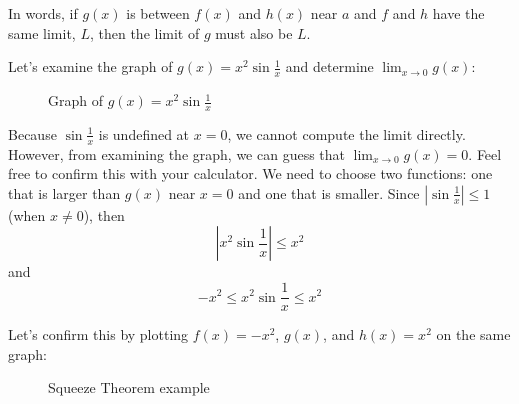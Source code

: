 In words, if $g(x)$ is between $f(x)$ and $h(x)$ near $a$ and $f$ and $h$ have the 
same limit, $L$, then the limit of $g$ must also be $L$. 

Let's examine the graph of $g(x) = x^2\sin{\frac{1}{x}}$ and determine $\lim_{x \to 
0}g(x)$:

\begin{figure}[htbp]
\centering
{}
\caption{Graph of $g(x) = x^2\sin{\frac{1}{x}}$}
\end{figure}

Because $\sin{\frac{1}{x}}$ is undefined at $x=0$, we cannot compute the limit 
directly. However, from examining the graph, we can guess that $\lim_{x \to 0}
g(x)=0$. Feel free to confirm this with your calculator. We need to choose two 
functions: one that is larger than $g(x)$ near $x=0$ and one that is smaller. Since 
$|\sin{\frac{1}{x}}|\leq 1$ (when $x \neq 0$), then $$|x^2\sin{\frac{1}{x}}|\leq 
x^2$$ and $$-x^2\leq x^2\sin{\frac{1}{x}} \leq x^2$$

Let's confirm this by plotting $f(x)=-x^2$, $g(x)$, and $h(x)=x^2$ on the same 
graph:

\begin{figure}[htbp]
\centering

\caption{Squeeze Theorem example}
\end{figure}

